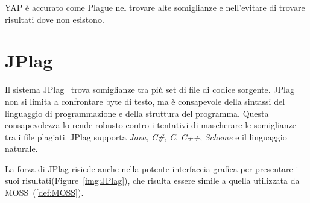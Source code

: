 		YAP è accurato come Plague nel trovare alte somiglianze e nell'evitare di trovare risultati dove non esistono. 
		
	\section{JPlag}
		Il sistema JPlag~\citep{JPlag} trova somiglianze tra più set di file di codice sorgente. JPlag non si limita a confrontare byte di testo, ma è consapevole della sintassi del linguaggio di programmazione e della struttura del programma. Questa consapevolezza lo rende robusto contro i tentativi di mascherare le somiglianze tra i file plagiati. JPlag supporta \textit{Java}, \textit{C\#}, \textit{C}, \textit{C++}, \textit{Scheme} e il linguaggio naturale.
		
		La forza di JPlag risiede anche nella potente interfaccia grafica per presentare i suoi risultati(Figure~\ref{img:JPlag}), che risulta essere simile a quella utilizzata da MOSS~(\ref{def:MOSS}).
		
		\begin{center}
			\label{img:JPlag}
		\end{center}